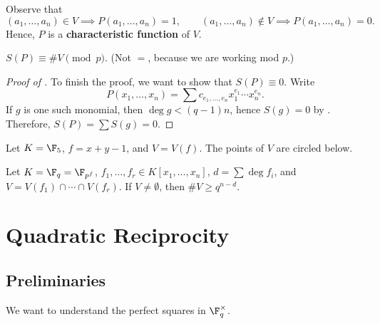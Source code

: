 Observe that
$$(a_1,\dots,a_n) \in V \implies P(a_1,\dots,a_n) = 1, \qquad (a_1,\dots,a_n) \notin V \implies P(a_1,\dots,a_n) = 0.$$
Hence, $P$ is a \textbf{characteristic function} of $V$.

\begin{lem}
    $S(P) \equiv \# V \pmod p$. (Not $=$, because we are working mod $p$.)
\end{lem}

\begin{proof}[Proof of ]
    To finish the proof, we want to show that $S(P) \equiv 0$. Write
    $$P(x_1,\dots,x_n) = \sum c_{e_1,\dots,e_n} x_1^{e_1} \cdots x_n^{e_n}.$$
    If $g$ is one such monomial, then $\deg g < (q-1)n$, hence $S(g) = 0$ by . Therefore, $S(P) = \sum S(g) = 0$.
\end{proof}

\begin{ex}
    Let $K = \F_5$, $f = x + y - 1$, and $V = V(f)$. The points of $V$ are circled below.
    \begin{center}
    \end{center}
\end{ex}

\begin{thm}
    Let $K = \F_q = \F_{p^f}$, $f_1,\dots,f_r \in K[x_1,\dots,x_n]$, $d = \sum \deg f_i$, and $V = V(f_1) \cap \cdots \cap V(f_r)$. If $V \neq \emptyset$, then $\# V \geq q^{n-d}$.
\end{thm}

\section{Quadratic Reciprocity}

\subsection{Preliminaries}

We want to understand the perfect squares in $\F_q^\times$.

